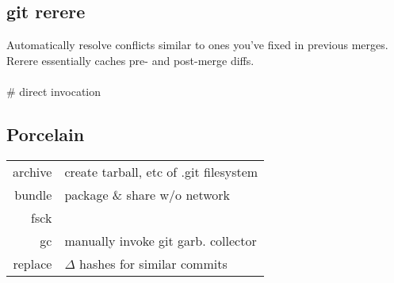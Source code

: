 \subsection*{git rerere}
Automatically resolve conflicts similar to ones you've fixed in previous merges. Rerere essentially caches pre- and post-merge diffs. \\
\\
 \# direct invocation \\





\subsection*{Porcelain}
{\scriptsize
\begin{tabular}{r l}
archive & create tarball, etc of .git filesystem\\
bundle & package \& share w/o network \\
fsck & \\
gc & manually invoke git garb. collector\\
replace & $\Delta$ hashes for similar commits \\
\end{tabular}}
\\

